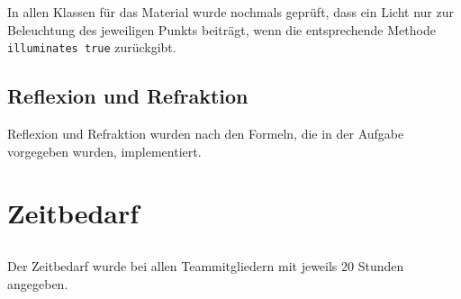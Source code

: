 \documentclass[11pt]{amsart}
\begin{document}
In allen Klassen f\"ur das Material wurde nochmals gepr\"uft, dass ein Licht nur zur Beleuchtung des jeweiligen Punkts 
beitr\"agt, wenn die entsprechende Methode \texttt{illuminates true} zur\"uckgibt.


\subsection{Reflexion und Refraktion}
Reflexion und Refraktion wurden nach den Formeln, die in der Aufgabe vorgegeben wurden, implementiert.



\section{Zeitbedarf}
\subsection{}
Der Zeitbedarf wurde bei allen Teammitgliedern mit jeweils 20 Stunden angegeben.
\end{document}
